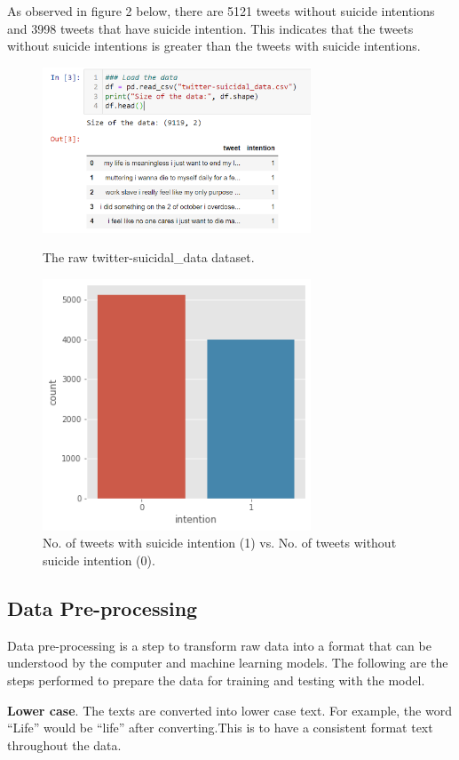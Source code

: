 \documentclass[runningheads]{llncs}
\begin{document}
\indent As observed in figure 2 below, there are 5121 tweets without suicide intentions and 3998 tweets that have suicide intention. This indicates that the tweets without suicide intentions is greater than the tweets with suicide intentions.

\begin{figure}
    \centering
    \includegraphics[width=8cm]{datacol.png}
    \caption{The raw twitter-suicidal\_data dataset.} \label{fig1}
    \vspace{1cm}
    \includegraphics[width=8cm]{intentiongraph.png}
    \caption{No. of tweets with suicide intention (1) vs. No. of tweets without suicide intention (0).} \label{fig1}
\end{figure}

\subsection{Data Pre-processing}
Data pre-processing is a step to transform raw data into a format that can be understood by the computer and machine learning models. The following are the steps performed to prepare the data for training and testing with the model.

\textbf{Lower case}. The texts are converted into lower case text. For example, the word “Life” would be “life” after converting.This is to have a consistent format text throughout the data.
\end{document}
